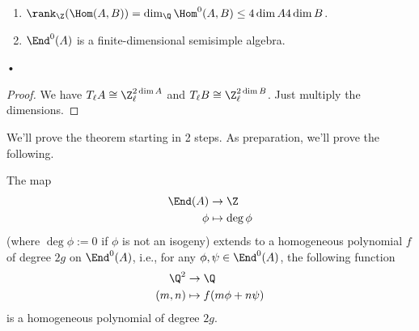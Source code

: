 \begin{cor}
\begin{enumerate}
\item
$\rank_{\Z}(\Hom(A,B))=\dim_{\Q}\Hom^0 (A,B)\le 4\dim A 4\dim B$.
\item
$\End^0(A)$ is a finite-dimensional semisimple algebra.
\end{enumerate}•
\end{cor}
\begin{proof}
We have $T_{\ell}A\cong \Z_{\ell}^{2\dim A}$ and $T_{\ell}B\cong \Z_{\ell}^{2\dim B}$. Just multiply the dimensions.
\end{proof}
We'll prove the theorem starting in 2 steps. As preparation, we'll prove the following.
\begin{thm}
The map
\begin{align*}
\End(A)&\to \Z\\
\phi&\mapsto \deg \phi
\end{align*}
(where $\deg\phi:=0$ if $\phi$ is not an isogeny) extends to a homogeneous polynomial $f$ of degree $2g$ on $\End^0(A)$, i.e., for any $\phi,\psi\in \End^0(A)$, the following function
\begin{align*}
\Q^2&\to \Q\\
(m,n)&\mapsto f(m\phi+n\psi)
\end{align*}
is a homogeneous polynomial of degree $2g$. %
\end{thm}
